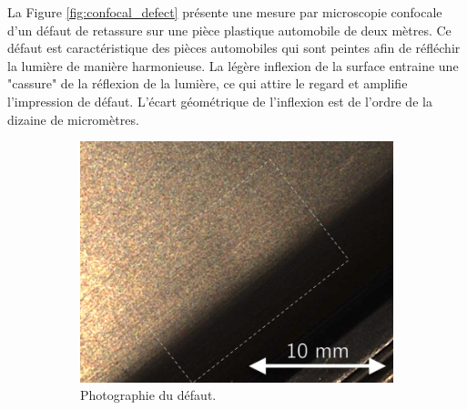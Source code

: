 La Figure \ref{fig:confocal_defect} présente une mesure par microscopie confocale d'un défaut de retassure sur une pièce plastique automobile de deux mètres.
Ce défaut est caractéristique des pièces automobiles qui sont peintes afin de réfléchir la lumière de manière harmonieuse.
La légère inflexion de la surface entraine une "cassure" de la réflexion de la lumière, ce qui attire le regard et amplifie l'impression de défaut.
L'écart géométrique de l'inflexion est de l'ordre de la dizaine de micromètres.

\bigskip

\begin{figure}[tbhp]
	\centering
	\begin{subfigure}[c]{0.48\textwidth}
		\centering
		\includegraphics[width=\textwidth]{../Chap2/Figures/Cam1_Image_22_PO_defect_AVEC.jpg}
		\caption{Photographie du défaut.}
	\end{subfigure}
	\begin{subfigure}[c]{0.48\textwidth}
		\centering

\end{subfigure}
\end{figure}
